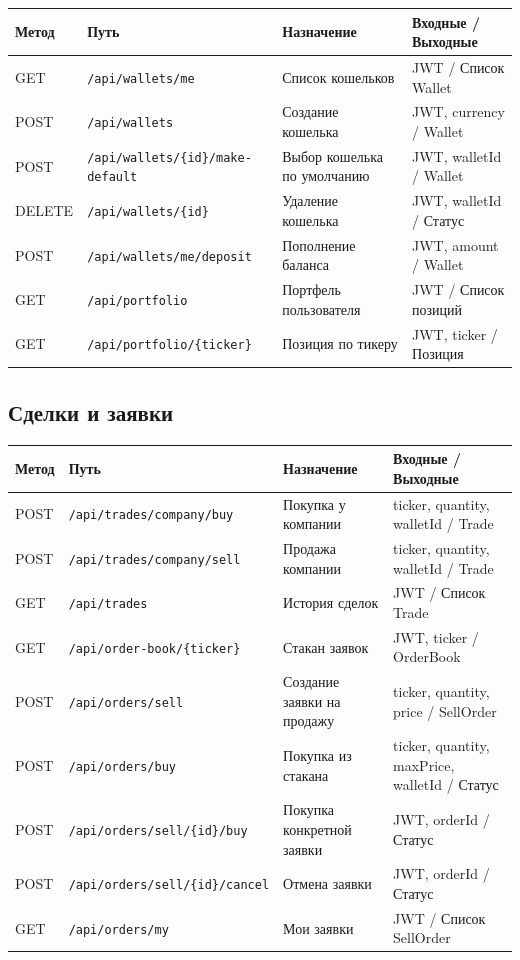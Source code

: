 \documentclass[12pt,a4paper]{article}
\begin{document}
\begin{longtable}{p{1.5cm}p{4.5cm}p{3.5cm}p{5cm}}
\toprule
\textbf{Метод} & \textbf{Путь} & \textbf{Назначение} & \textbf{Входные / Выходные} \\
\midrule
\endhead
GET & \texttt{/api/wallets/me} & Список кошельков & JWT / Список Wallet \\
POST & \texttt{/api/wallets} & Создание кошелька & JWT, currency / Wallet \\
POST & \texttt{/api/wallets/\{id\}/make-default} & Выбор кошелька по умолчанию & JWT, walletId / Wallet \\
DELETE & \texttt{/api/wallets/\{id\}} & Удаление кошелька & JWT, walletId / Статус \\
POST & \texttt{/api/wallets/me/deposit} & Пополнение баланса & JWT, amount / Wallet \\
GET & \texttt{/api/portfolio} & Портфель пользователя & JWT / Список позиций \\
GET & \texttt{/api/portfolio/\{ticker\}} & Позиция по тикеру & JWT, ticker / Позиция \\
\bottomrule
\end{longtable}

\subsection{Сделки и заявки}

\begin{longtable}{p{1.5cm}p{5cm}p{3cm}p{5cm}}
\toprule
\textbf{Метод} & \textbf{Путь} & \textbf{Назначение} & \textbf{Входные / Выходные} \\
\midrule
\endhead
POST & \texttt{/api/trades/company/buy} & Покупка у компании & ticker, quantity, walletId / Trade \\
POST & \texttt{/api/trades/company/sell} & Продажа компании & ticker, quantity, walletId / Trade \\
GET & \texttt{/api/trades} & История сделок & JWT / Список Trade \\
GET & \texttt{/api/order-book/\{ticker\}} & Стакан заявок & JWT, ticker / OrderBook \\
POST & \texttt{/api/orders/sell} & Создание заявки на продажу & ticker, quantity, price / SellOrder \\
POST & \texttt{/api/orders/buy} & Покупка из стакана & ticker, quantity, maxPrice, walletId / Статус \\
POST & \texttt{/api/orders/sell/\{id\}/buy} & Покупка конкретной заявки & JWT, orderId / Статус \\
POST & \texttt{/api/orders/sell/\{id\}/cancel} & Отмена заявки & JWT, orderId / Статус \\
GET & \texttt{/api/orders/my} & Мои заявки & JWT / Список SellOrder \\
\bottomrule
\end{longtable}
\end{document}
